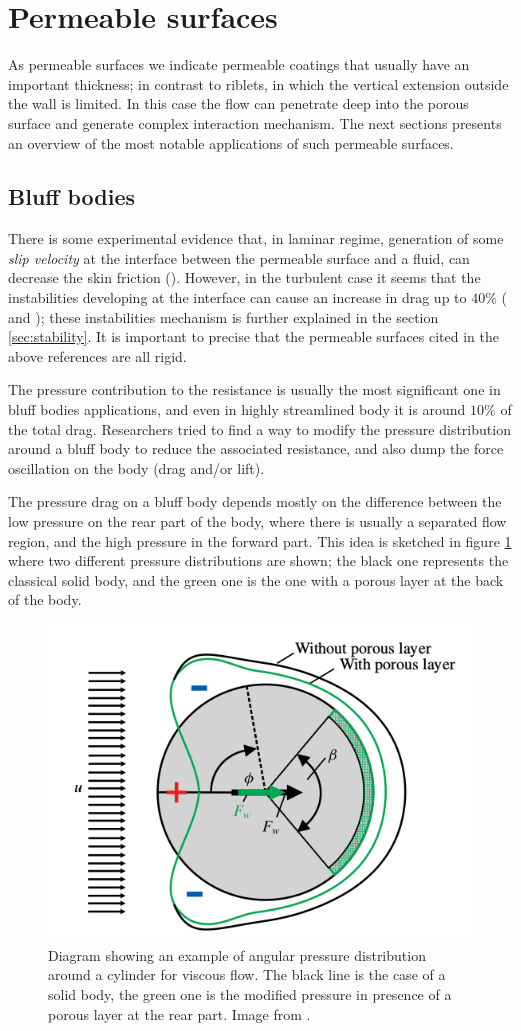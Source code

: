 \section{Permeable surfaces}
As permeable surfaces we indicate permeable coatings that usually have an important thickness; in contrast to riblets, in which the vertical extension outside the wall is limited.
In this case the flow can penetrate deep into the porous surface and generate complex interaction mechanism.
The next sections presents an overview of the most notable applications of such permeable surfaces.

\subsection{Bluff bodies}

There is some experimental evidence that, in laminar regime, generation of some \textit{slip velocity} at the interface between the permeable surface and a fluid, can decrease the skin friction (\citet{beavers1967boundary}).
However, in the turbulent case it seems that the instabilities developing at the interface can cause an increase in drag up to $40\%$ (\citet{jimenez2001turbulent} and  \citet{breugem2006influence}); these instabilities mechanism is further explained in the section \ref{sec:stability}.
It is important to precise that the permeable surfaces cited in the above references are all rigid.

The pressure contribution to the resistance is usually the most significant one in bluff bodies applications, and even in highly streamlined body it is around $10\%$ of the total drag.
Researchers tried to find a way to modify the pressure distribution around a bluff body to reduce the associated resistance, and also dump the force oscillation on the body (drag and/or lift).

The pressure drag on a bluff body depends mostly on the difference between the low pressure on the rear part of the body, where there is usually a separated flow region, and the high pressure in the forward part.
This idea is sketched in figure \ref{fig:pressure_dist} where two different pressure distributions are shown; the black one represents the classical solid body, and the green one is the one with a porous layer at the back of the body.

\begin{figure}[h]
	\centering
	\includegraphics[width=0.4\linewidth]{chapter_1/pressure_dist}
	\caption{Diagram showing an example of angular pressure distribution around a cylinder for viscous flow. The black line is the case of a solid body, the green one is the modified pressure in presence of a porous layer at the rear part. Image from \citet{klausmann2017drag}.}
	\label{fig:pressure_dist}
\end{figure}

